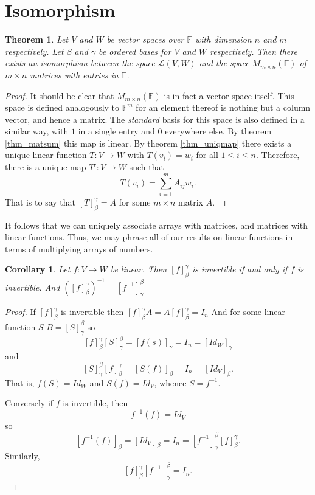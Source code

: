 \documentclass[oneside, 12pt]{book}
\newtheorem{thm}{Theorem}[section]
\newtheorem{cor}{Corollary}[section]
\theoremstyle{definition}
\begin{document}
\section{Isomorphism}
\begin{thm}
\label{thm_matiso}
  Let $V$ and $W$ be vector spaces over $\mathbb{F}$ with dimension $n$ and $m$ respectively. Let $\beta$ and $\gamma$ be ordered bases for $V$ and $W$ respectively. Then there exists an isomorphism between the space $\mathcal{L}(V,W)$ and the space $M_{m \times n}(\mathbb{F})$ of $m \times n$ matrices with entries in $\mathbb{F}$.
\end{thm}
\begin{proof}
  It should be clear that $M_{m \times n}(\mathbb{F})$ is in fact a vector space itself. This space is defined analogously to $\mathbb{F}^{m}$ for an element thereof is nothing but a column vector, and hence a matrix. The \emph{standard} basis for this space is also defined in a similar way, with $1$ in a single entry and $0$ everywhere else.
  By theorem \ref{thm_matsum} this map is linear. By theorem \ref{thm_uniqmap} there exists a unique linear function $T: V \to W$ with $T(v_{i})=w_{i}$ for all $1 \leq i \leq n$. Therefore, there is a unique map $T':V \to W$ such that \[T(v_{i})=\sum_{i=1}^{m}A_{ij}w_{i}.\] That is to say that $[T]_{\beta}^{\gamma}=A$ for some $m \times n$ matrix $A$.
\end{proof}
It follows that we can uniquely associate arrays with matrices, and matrices with linear functions. Thus, we may phrase all of our results on linear functions in terms of multiplying arrays of numbers.
\begin{cor}
\label{thm_matinv}
Let $f: V \to W$ be linear. Then $[f]_{\beta}^{\gamma}$ is invertible if and only if $f$ is invertible. And $([f]_{\beta}^{\gamma})^{-1}=[f^{-1}]_{\gamma}^{\beta}$
\end{cor}
\begin{proof}
  If $[f]_{\beta}^{\gamma}$ is invertible then $[f]_{\beta}^{\gamma}A=A[f]_{\beta}^{\gamma}=I_{n}$ And for some linear function $S$ $B=[S]_{\gamma}^{\beta}$ so
  \[[f]_{\beta}^{\gamma}[S]_{\gamma}^{\beta}=[f(s)]_{\gamma}=I_{n}=[Id_{W}]_{\gamma}\] and \[[S]_{\gamma}^{\beta}[f]_{\beta}^{\gamma}=[S(f)]_{\beta}=I_{n}=[Id_{V}]_{\beta}.\]
  That is, $f(S)=Id_{W}$ and $S(f)=Id_{V}$, whence $S=f^{-1}$.

  Conversely if $f$ is invertible, then \[f^{-1}(f)=Id_{V}\] so \[[f^{-1}(f)]_{\beta}=[Id_{V}]_{\beta}=I_{n}=[f^{-1}]_{\gamma}^{\beta}[f]_{\beta}^{\gamma}.\]Similarly, \[[f]_{\beta}^{\gamma}[f^{-1}]_{\gamma}^{\beta}=I_{n}.\]
\end{proof}
\end{document}
